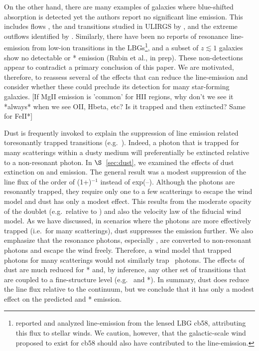 \documentclass[12pt,preprint]{aastex}
\begin{document}
On the other hand,
there are many examples of galaxies where blue-shifted absorption is
detected yet the authors report no significant line emission.  This
includes  flows \cite{rupke,martin,sato}, 
the  and  transitions studied in
ULIRGS by \cite{mb09}, and the extreme  outflows identified
by \cite{tmd07}.  Similarly, there have been no reports of
resonance line-emission from low-ion transitions in the
LBGs\footnote{\citet{psa+00}
  reported and analyzed  line-emission from the lensed LBG
  cb58, attributing this flux to stellar winds.  We caution, however,
  that the galactic-scale wind proposed to exist for cb58 should also
  have contributed to the  line-emission.}, and a subset of
$z \lesssim 1$ galaxies show no detectable  or *
emission (Rubin et al., in prep). 
These non-detections appear to contradict a primary conclusion of 
this paper.   We are motivated, therefore, to
reassess several of the effects that can reduce the line-emission
and consider whether these could preclude its detection for many
star-forming galaxies.  [If MgII emission is 'common' for HII regions,
why don't we see it *always* when we see OII, Hbeta, etc? Is it
trapped and then extincted? Same for FeII*]


Dust is frequently invoked to explain the suppression of line emission
related toresonantly trapped transitions (e.g.\ \lya).  Indeed, a photon
that is trapped for many scatterings within a dusty medium will 
preferentially be extincted relative to a non-resonant photon.  In
$\S$~\ref{sec:dust}, we examined the effects of dust extinction on 
 and  emission.  The general result was a modest
suppression of the line flux of the order of (1+\taud)$^{-1}$ instead of
exp(--\taud). Although the  photons are resonantly
trapped, they require only one to a few scatterings
to escape the wind model and dust has only a
modest effect.  This results from the moderate opacity of the 
doublet (e.g.\ relative to \lya) and also the velocity law of the
fiducial wind model.
As we have discussed, in scenarios where the  photons are
more effectively trapped (i.e.\ for many scatterings), dust suppresses
the emission further.
We also emphasize that the  resonance photons, especially
\feiia, are converted to non-resonant photons and escape the wind
freely.  Therefore, a wind model that trapped 
photons for many scatterings would not similarly trap 
\feiid\ photons.  The effects of dust are much 
reduced for * and, by inference, any other set of
transitions that are coupled to a fine-structure level (e.g.\
 and *).  In summary,
dust does reduce the line flux relative to the continuum, but we
conclude that it has only a modest effect on the predicted 
and \ion{Fe}{2}* emission.     
\end{document}
